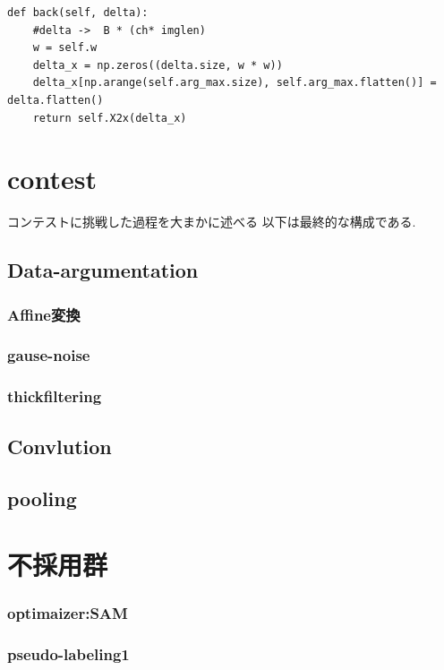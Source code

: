 \documentclass[a4paper,11pt]{jsarticle}
\begin{document}
\begin{lstlisting}[caption=pooling\_back]
  def back(self, delta):
    #delta ->  B * (ch* imglen) 
    w = self.w
    delta_x = np.zeros((delta.size, w * w))
    delta_x[np.arange(self.arg_max.size), self.arg_max.flatten()] = delta.flatten()
    return self.X2x(delta_x)
\end{lstlisting}

\section{contest}
コンテストに挑戦した過程を大まかに述べる
以下は最終的な構成である.
\subsection{Data-argumentation}
\subsubsection{Affine変換}
\subsubsection{gause-noise}
\subsubsection{thickfiltering}
\subsection{Convlution}
\subsection{pooling}
\subsection{}
\subsection{}
\section*{不採用群}
\subsubsection{optimaizer:SAM}
\subsubsection{pseudo-labeling1}
\end{document}

